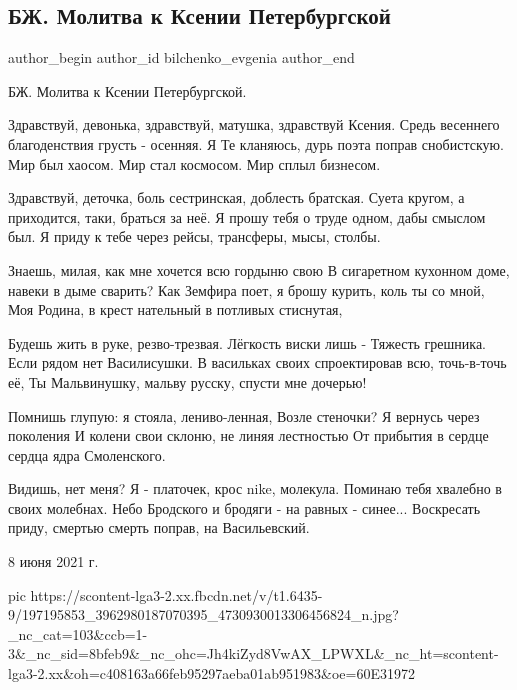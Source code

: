  
 
 
 
 
 
\subsection{БЖ. Молитва к Ксении Петербургской}
\label{sec:08_06_2021.fb.bilchenko_evgenia.2.ksenia_peterbugskaja_molitva}
\ifcmt
 author_begin
   author_id bilchenko_evgenia
 author_end
\fi

БЖ. Молитва к Ксении Петербургской.

Здравствуй, девонька, здравствуй, матушка, здравствуй Ксения.
Средь весеннего благоденствия грусть - осенняя.
Я Те кланяюсь, дурь поэта поправ снобистскую.
Мир был хаосом. Мир стал космосом. Мир сплыл бизнесом.

Здравствуй, деточка, боль сестринская, доблесть братская.
Суета кругом, а приходится, таки, браться за неё.
Я прошу тебя о труде одном, дабы смыслом был.
Я приду к тебе через рейсы, трансферы, мысы, столбы.

Знаешь, милая, как мне хочется всю гордыню свою
В сигаретном кухонном доме, навеки в дыме сварить?
Как Земфира поет, я брошу курить, коль ты со мной,
Моя Родина, в крест нательный в потливых стиснутая,

Будешь жить в руке, резво-трезвая. Лёгкость виски лишь -
Тяжесть грешника. Если рядом нет Василисушки.
В васильках своих спроектировав всю, точь-в-точь её,
Ты Мальвинушку, мальву русску, спусти мне дочерью!

Помнишь глупую: я стояла, лениво-ленная,
Возле стеночки? Я вернусь через поколения
И колени свои склоню, не линяя лестностью
От прибытия в сердце сердца ядра Смоленского.

Видишь, нет меня? Я - платочек, крос nike, молекула.
Поминаю тебя хвалебно в своих молебнах.
Небо Бродского и бродяги - на равных - синее...
Воскресать приду, смертью смерть поправ, на Васильевский.

8 июня 2021 г.

\ifcmt
  pic https://scontent-lga3-2.xx.fbcdn.net/v/t1.6435-9/197195853_3962980187070395_4730930013306456824_n.jpg?_nc_cat=103&ccb=1-3&_nc_sid=8bfeb9&_nc_ohc=Jh4kiZyd8VwAX_LPWXL&_nc_ht=scontent-lga3-2.xx&oh=c408163a66feb95297aeba01ab951983&oe=60E31972
\fi
